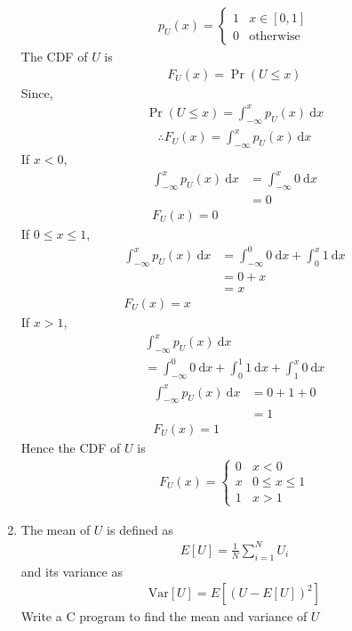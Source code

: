\documentclass[journal,12pt,twocolumn]{IEEEtran}
\providecommand{\pr}[1]{\ensuremath{\Pr\left(#1\right)}}
\providecommand{\mean}[1]{E\left[ #1 \right]}
\providecommand{\var}[1]{\mathrm{Var}\left[ #1 \right]}
\numberwithin{equation}{section}
\renewcommand\thesection{\arabic{section}}
\begin{document}
\begin{enumerate}[label=\thesection.\arabic*,ref=\thesection.\theenumi]
	\begin{align}
		p_{U}(x) = 
		\begin{cases}
			1 & x \in [0, 1] \\
			0 & \text{otherwise}
		\end{cases}
	\end{align}
        The CDF of $U$ is 
        \begin{align}
		F_{U}(x) = \pr{U \le x} 
	\end{align}
        Since, 
        \begin{align}
		\pr{U \le x}=\int_{-\infty}^x p_{U}(x) ~\mathrm{d}x 
	\end{align}
	\begin{align*}
    \therefore F_{U}(x) = \int_{-\infty}^x p_{U}(x) ~\mathrm{d}x
	\end{align*}
	If $x<0$,
	\begin{align}
\int_{-\infty}^x p_{U}(x) ~\mathrm{d}x &= \int_{-\infty}^x 0 ~\mathrm{d}x \\
&= 0\\
F_{U}(x)=0
	\end{align}
	If  $ 0 \leq x \leq 1 $,
	\begin{align}
		\int_{-\infty}^x p_{U}(x) ~\mathrm{d}x &= \int_{-\infty}^0 0 ~\mathrm{d}x + \int_0^x 1 ~\mathrm{d}x \\
		&= 0 + x \\
		&= x\\
            F_{U}(x)=x
	\end{align}
	If $x>1$,
	\begin{multline}
		\int_{-\infty}^x p_{U}(x) ~\mathrm{d}x \\= \int_{-\infty}^0 0 ~\mathrm{d}x + \int_0^1 1 ~\mathrm{d}x +  \int_1^x 0 ~\mathrm{d}x 
	\end{multline}
	\begin{align}
		\int_{-\infty}^x p_{U}(x) ~\mathrm{d}x &= 0 + 1 + 0 \\
		&= 1\\
            F_{U}(x)=1
	\end{align}
	Hence the CDF of $U$ is 
	\begin{align}
		F_{U}(x) = 
		\begin{cases}
			0 & x < 0 \\
			x & 0 \le x \le 1 \\
			1 & x > 1
		\end{cases}
	\end{align}
	
	\item The mean of $U$ is defined as
	\begin{align}
		\mean{U} = \frac{1}{N}\sum_{i=1}^{N}U_i
	\end{align}
	and its variance as
	\begin{align}
		\var{U} = E[(U-E[U])^2]
	\end{align}
	Write a C program to  find the mean and variance of $U$
	

\end{enumerate}
\end{document}
